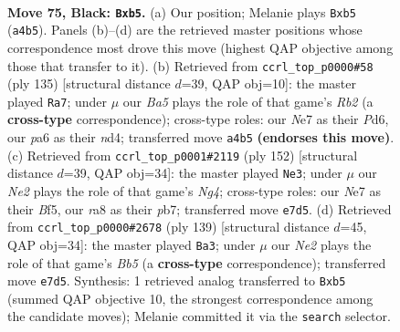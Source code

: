 \documentclass[11pt]{article}
\begin{document}
\clearpage

\begin{figure}[p]\centering
\begin{subfigure}{0.46\textwidth}\centering
\resizebox{\linewidth}{!}{%
\newchessgame
\chessboard[
  setfen={R7/p3n1k1/P3R3/1P3p2/b4P1b/8/3r4/6K1 b - - 6 75},
  showmover=false,
  pgfstyle=straightmove, color=movearrow, markmove={a4-b5}
]}
\caption{}
\end{subfigure}\hfill
\begin{subfigure}{0.46\textwidth}\centering
\resizebox{\linewidth}{!}{%
\newchessgame
\chessboard[
  setfen={4b3/1r5k/p2p4/3R3p/3N3P/3P2P1/8/4K3 b - - 8 68},
  showmover=false,
  pgfstyle=straightmove, color=movearrow, markmove={b7-a7}
]}
\caption{}
\end{subfigure}
\\[4pt]
\begin{subfigure}{0.46\textwidth}\centering
\resizebox{\linewidth}{!}{%
\newchessgame
\chessboard[
  setfen={7k/1p6/7P/5Br1/p3p1N1/P7/1P6/5K2 w - - 0 77},
  showmover=false,
  pgfstyle=straightmove, color=movearrow, markmove={g4-e3}
]}
\caption{}
\end{subfigure}\hfill
\begin{subfigure}{0.46\textwidth}\centering
\resizebox{\linewidth}{!}{%
\newchessgame
\chessboard[
  setfen={8/6k1/8/2n2Kp1/pbR5/5P2/P7/8 b - - 19 70},
  showmover=false,
  pgfstyle=straightmove, color=movearrow, markmove={b4-a3}
]}
\caption{}
\end{subfigure}
\caption{\textbf{Move 75, Black: \texttt{Bxb5}.} (a) Our position; Melanie plays \texttt{Bxb5} (\texttt{a4b5}). Panels (b)--(d) are the retrieved master positions whose correspondence most drove this move (highest QAP objective among those that transfer to it). (b) Retrieved from \texttt{ccrl\_top\_p0000\#58} (ply 135) [structural distance $d$=39, QAP obj=10]: the master played \texttt{Ra7}; under $\mu$ our \emph{Ba5} plays the role of that game's \emph{Rb2} (a \textbf{cross-type} correspondence); cross-type roles: our \emph{N}e7 as their \emph{P}d6, our \emph{p}a6 as their \emph{n}d4; transferred move \texttt{a4b5} \textbf{(endorses this move)}. (c) Retrieved from \texttt{ccrl\_top\_p0001\#2119} (ply 152) [structural distance $d$=39, QAP obj=34]: the master played \texttt{Ne3}; under $\mu$ our \emph{Ne2} plays the role of that game's \emph{Ng4}; cross-type roles: our \emph{N}e7 as their \emph{B}f5, our \emph{r}a8 as their \emph{p}b7; transferred move \texttt{e7d5}. (d) Retrieved from \texttt{ccrl\_top\_p0000\#2678} (ply 139) [structural distance $d$=45, QAP obj=34]: the master played \texttt{Ba3}; under $\mu$ our \emph{Ne2} plays the role of that game's \emph{Bb5} (a \textbf{cross-type} correspondence); transferred move \texttt{e7d5}. Synthesis: 1 retrieved analog transferred to \texttt{Bxb5} (summed QAP objective 10, the strongest correspondence among the candidate moves); Melanie committed it via the \texttt{search} selector.}
\label{fig:thought-m149}
\end{figure}
\end{document}
